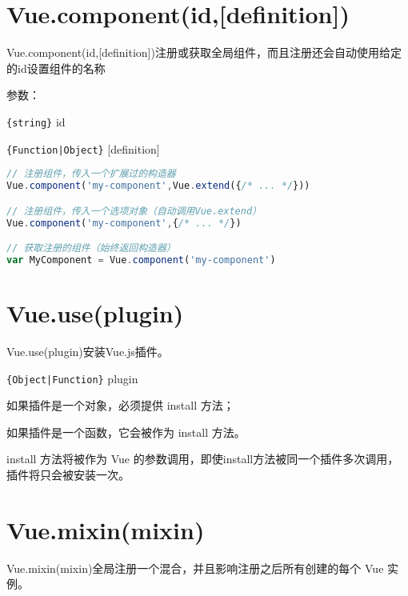 \section{Vue.component(id,[definition])}

Vue.component(id,[definition])注册或获取全局组件，而且注册还会自动使用给定的id设置组件的名称

参数：

\begin{compactenum}
\item \texttt{\{string\}} id 
\item \texttt{\{Function|Object\}} [definition]
\end{compactenum}


\begin{lstlisting}[language=JavaScript]
// 注册组件，传入一个扩展过的构造器
Vue.component('my-component',Vue.extend({/* ... */}))

// 注册组件，传入一个选项对象（自动调用Vue.extend）
Vue.component('my-component',{/* ... */})

// 获取注册的组件（始终返回构造器）
var MyComponent = Vue.component('my-component')
\end{lstlisting}

\section{Vue.use(plugin)}

Vue.use(plugin)安装Vue.js插件。

\begin{compactitem}
\item \texttt{\{Object|Function\}} plugin
\end{compactitem}




\begin{compactitem}
\item 如果插件是一个对象，必须提供 install 方法；
\item 如果插件是一个函数，它会被作为 install 方法。
\end{compactitem}

install 方法将被作为 Vue 的参数调用，即使install方法被同一个插件多次调用，插件将只会被安装一次。

\section{Vue.mixin(mixin)}

Vue.mixin(mixin)全局注册一个混合，并且影响注册之后所有创建的每个 Vue 实例。

